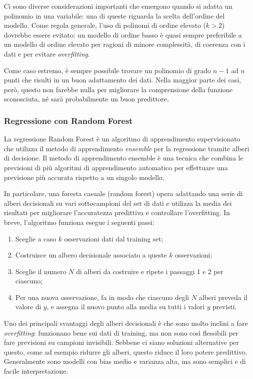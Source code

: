Ci sono diverse considerazioni importanti che emergono quando si adatta un polinomio in una variabile: una di queste riguarda la scelta dell'ordine del modello.
Come regola generale, l'uso di polinomi di ordine elevato ($k > 2$) dovrebbe essere evitato: un modello di ordine basso è quasi sempre preferibile a un modello di ordine elevato per ragioni di minore complessità, di coerenza con i dati e per evitare \textit{overfitting}.

Come caso estremo, è sempre possibile trovare un polinomio di grado $n-1$ ad $n$ punti che risulti in un buon adattamento dei dati.
Nella maggior parte dei casi, però, questo non farebbe nulla per migliorare la comprensione della funzione sconosciuta, né sarà probabilmente un buon predittore.

\subsubsection{Regressione con Random Forest}\label{sssec:regressione-rf}
La regressione Random Forest è un algoritmo di apprendimento supervisionato che utilizza il metodo di apprendimento \textit{ensemble} per la regressione tramite alberi di decisione. Il metodo di apprendimento ensemble è una tecnica che combina le previsioni di più algoritmi di apprendimento automatico per effettuare una previsione più accurata rispetto a un singolo modello. \cite{random_forest}

In particolare, una foresta casuale (random forest) opera adattando una serie di alberi decisionali su vari sottocampioni del set di dati e utilizza la media dei risultati per migliorare l'accuratezza predittiva e controllare l'overfitting.
In breve, l'algoritmo funziona esegue i seguenti passi:

\begin{enumerate}
  \item Sceglie a caso $k$ osservazioni dati dal training set;
  \item Costruisce un albero decisionale associato a queste $k$ osservazioni;
  \item Sceglie il numero $N$ di alberi da costruire e ripete i passaggi 1 e 2 per ciascuno;
  \item Per una nuova osservazione, fa in modo che ciascuno degli $N$ alberi preveda il valore di $y$, e assegna il nuovo punto alla media su tutti i valori $y$ previsti.
\end{enumerate}

Uno dei principali svantaggi degli alberi decisionali è che sono molto inclini a fare \textit{overfitting}: funzionano bene sui dati di training, ma non sono così flessibili per fare previsioni su campioni invisibili. Sebbene ci siano soluzioni alternative per questo, come ad esempio ridurre gli alberi, questo riduce il loro potere predittivo. Generalmente sono modelli con bias medio e varianza alta, ma sono semplici e di facile interpretazione.

